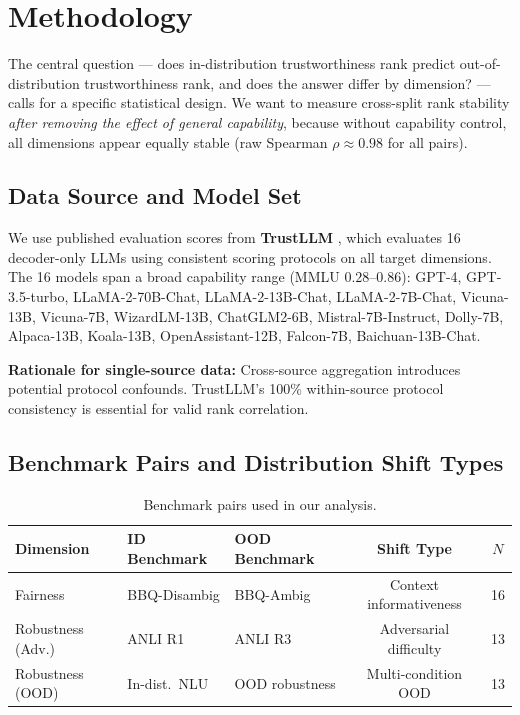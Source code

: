 \section{Methodology}
\label{sec:methodology}

The central question --- does in-distribution trustworthiness rank predict out-of-distribution trustworthiness rank, and does the answer differ by dimension? --- calls for a specific statistical design. We want to measure cross-split rank stability \emph{after removing the effect of general capability}, because without capability control, all dimensions appear equally stable (raw Spearman $\rho \approx 0.98$ for all pairs).

\subsection{Data Source and Model Set}

We use published evaluation scores from \textbf{TrustLLM} \citep{Sun2024TrustLLM}, which evaluates 16 decoder-only LLMs using consistent scoring protocols on all target dimensions. The 16 models span a broad capability range (MMLU $0.28$--$0.86$): GPT-4, GPT-3.5-turbo, LLaMA-2-70B-Chat, LLaMA-2-13B-Chat, LLaMA-2-7B-Chat, Vicuna-13B, Vicuna-7B, WizardLM-13B, ChatGLM2-6B, Mistral-7B-Instruct, Dolly-7B, Alpaca-13B, Koala-13B, OpenAssistant-12B, Falcon-7B, Baichuan-13B-Chat.

\textbf{Rationale for single-source data:} Cross-source aggregation introduces potential protocol confounds. TrustLLM's 100\% within-source protocol consistency is essential for valid rank correlation.

\subsection{Benchmark Pairs and Distribution Shift Types}

\begin{table}[h]
\centering
\caption{Benchmark pairs used in our analysis.}
\label{tab:benchmarks}
\begin{tabular}{lllcc}
\toprule
Dimension & ID Benchmark & OOD Benchmark & Shift Type & $N$ \\
\midrule
Fairness & BBQ-Disambig & BBQ-Ambig & Context informativeness & 16 \\
Robustness (Adv.) & ANLI R1 & ANLI R3 & Adversarial difficulty & 13 \\
Robustness (OOD) & In-dist.\ NLU & OOD robustness & Multi-condition OOD & 13 \\
\bottomrule
\end{tabular}
\end{table}

